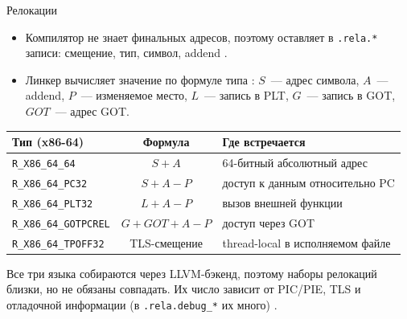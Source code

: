\documentclass[aspectratio=169,11pt]{beamer}
\renewcommand{\arraystretch}{1.14}
\begin{document}
\begin{frame}{Релокации}
  \small
  \begin{itemize}
    \item Компилятор не знает финальных адресов, поэтому оставляет в \texttt{.rela.*} записи: смещение, тип, символ, addend \cite{tis}.
    \item Линкер вычисляет значение по формуле типа \cite{psabi}: $S$~--- адрес символа, $A$~--- addend, $P$~--- изменяемое место, $L$~--- запись в PLT, $G$~--- запись в GOT, $GOT$~--- адрес GOT.
  \end{itemize}
  \footnotesize
  \begin{center}
    \renewcommand{\arraystretch}{1.0}
    \setlength{\tabcolsep}{4pt}
    \begin{tabularx}{0.98\textwidth}{lcY}
      \toprule
      Тип (x86-64)                  & Формула      & Где встречается                                      \\
      \midrule
      \texttt{R\_X86\_64\_64}       & $S+A$        & 64-битный абсолютный адрес \cite{psabi}              \\
      \texttt{R\_X86\_64\_PC32}     & $S+A-P$      & доступ к данным относительно PC \cite{bender}        \\
      \texttt{R\_X86\_64\_PLT32}    & $L+A-P$      & вызов внешней функции \cite{bender}                  \\
      \texttt{R\_X86\_64\_GOTPCREL} & $G+GOT+A-P$  & доступ через GOT \cite{bender}                       \\
      \texttt{R\_X86\_64\_TPOFF32}  & TLS-смещение & thread-local в исполняемом файле \cite{drepperTLS}   \\
      \bottomrule
    \end{tabularx}
  \end{center}
  Все три языка собираются через LLVM-бэкенд, поэтому наборы релокаций близки, но не обязаны совпадать. Их число зависит от PIC/PIE, TLS и отладочной информации (в \texttt{.rela.debug\_*} их много) \cite{maskray}.
\end{frame}
\end{document}

